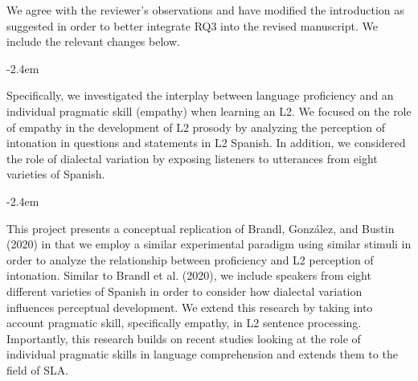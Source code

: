 \documentclass[]{article}
\renewenvironment{quote}{\begin{fquote}\advance\leftmargini -2.4em\begin{oldquote}}{\end{oldquote}\end{fquote}}
\newenvironment{fquote}
  {\def\FrameCommand{
	\fboxsep=0.6em %
	\fcolorbox{black}{white}}%
    \MakeFramed {\advance\hsize-2\width \FrameRestore}
    \begin{minipage}{\linewidth}
  }
  {\end{minipage}\endMakeFramed}
\begin{document}

We agree with the reviewer's observations and have modified the introduction as suggested in order to better integrate RQ3 into the revised manuscript.
We include the relevant changes below.

\begin{quote}
Specifically, we investigated the interplay between language proficiency and an individual pragmatic skill (empathy) when learning an L2.
We focused on the role of empathy in the development of L2 prosody by analyzing the perception of intonation in questions and statements in L2 Spanish.
In addition, we considered the role of dialectal variation by exposing listeners to utterances from eight varieties of Spanish.
\end{quote}

\begin{quote}
This project presents a conceptual replication of Brandl, González, and Bustin (2020) in that we employ a similar experimental paradigm using similar stimuli in order to analyze the relationship between proficiency and L2 perception of intonation.
Similar to Brandl et al. (2020), we include speakers from eight different varieties of Spanish in order to consider how dialectal variation influences perceptual development.
We extend this research by taking into account pragmatic skill, specifically empathy, in L2 sentence processing.
Importantly, this research builds on recent studies looking at the role of individual pragmatic skills in language comprehension and extends them to the field of SLA.
\end{quote}
\end{document}
